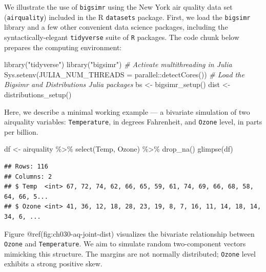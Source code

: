 \documentclass{article}
\newenvironment{Shaded}{\begin{snugshade}}{\end{snugshade}}
\newcommand{\AttributeTok}[1]{\textcolor[rgb]{0.77,0.63,0.00}{#1}}
\newcommand{\CommentTok}[1]{\textcolor[rgb]{0.56,0.35,0.01}{\textit{#1}}}
\newcommand{\FunctionTok}[1]{\textcolor[rgb]{0.00,0.00,0.00}{#1}}
\newcommand{\NormalTok}[1]{#1}
\newcommand{\OtherTok}[1]{\textcolor[rgb]{0.56,0.35,0.01}{#1}}
\newcommand{\SpecialCharTok}[1]{\textcolor[rgb]{0.00,0.00,0.00}{#1}}
\newcommand{\StringTok}[1]{\textcolor[rgb]{0.31,0.60,0.02}{#1}}
\begin{document}
We illustrate the use of \texttt{bigsimr} using the New York air quality
data set (\texttt{airquality}) included in the R \texttt{datasets}
package. First, we load the \texttt{bigsimr} library and a few other
convenient data science packages, including the syntactically-elegant
\texttt{tidyverse} suite of \texttt{R} packages. The code chunk below
prepares the computing environment:

\begin{Shaded}
\begin{Highlighting}[]
\FunctionTok{library}\NormalTok{(}\StringTok{"tidyverse"}\NormalTok{)}
\FunctionTok{library}\NormalTok{(}\StringTok{"bigsimr"}\NormalTok{)}
\CommentTok{\# Activate multithreading in Julia}
\FunctionTok{Sys.setenv}\NormalTok{(}\AttributeTok{JULIA\_NUM\_THREADS =}\NormalTok{ parallel}\SpecialCharTok{::}\FunctionTok{detectCores}\NormalTok{())}
\CommentTok{\# Load the Bigsimr and Distributions Julia packages}
\NormalTok{bs }\OtherTok{\textless{}{-}} \FunctionTok{bigsimr\_setup}\NormalTok{()}
\NormalTok{dist }\OtherTok{\textless{}{-}} \FunctionTok{distributions\_setup}\NormalTok{()}
\end{Highlighting}
\end{Shaded}

Here, we describe a minimal working example --- a bivariate simulation
of two airquality variables: \texttt{Temperature}, in degrees
Fahrenheit, and \texttt{Ozone} level, in parts per billion.

\begin{Shaded}
\begin{Highlighting}[]
\NormalTok{df }\OtherTok{\textless{}{-}}\NormalTok{ airquality }\SpecialCharTok{\%\textgreater{}\%} \FunctionTok{select}\NormalTok{(Temp, Ozone) }\SpecialCharTok{\%\textgreater{}\%} \FunctionTok{drop\_na}\NormalTok{()}
\FunctionTok{glimpse}\NormalTok{(df)}
\end{Highlighting}
\end{Shaded}

\begin{verbatim}
## Rows: 116
## Columns: 2
## $ Temp  <int> 67, 72, 74, 62, 66, 65, 59, 61, 74, 69, 66, 68, 58, 64, 66, 5...
## $ Ozone <int> 41, 36, 12, 18, 28, 23, 19, 8, 7, 16, 11, 14, 18, 14, 34, 6, ...
\end{verbatim}

Figure @ref(fig:ch030-aq-joint-dist) visualizes the bivariate
relationship between \texttt{Ozone} and \texttt{Temperature}. We aim to
simulate random two-component vectors mimicking this structure. The
margins are not normally distributed; \texttt{Ozone} level exhibits a
strong positive skew.
\end{document}

